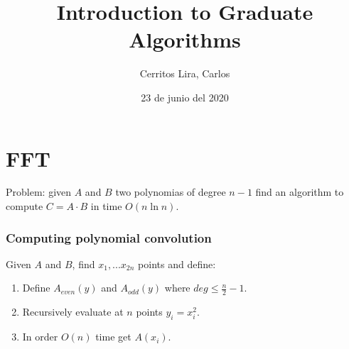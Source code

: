 \documentclass{article}
\title{Introduction to Graduate Algorithms}
\author{Cerritos Lira, Carlos}
\date{23 de junio del 2020}
\begin{document}
\maketitle

\section*{FFT}
Problem: given $A$ and $B$ two polynomias of degree $n-1$ find an 
algorithm to compute $C = A \cdot B$ in time $O(n \ln n)$. 
\subsubsection*{Computing polynomial convolution}
Given $A$ and $B$, find $x_1,...x_{2n}$ points and define:
\begin{enumerate}
    \item Define $A_{even}(y)$ and $A_{odd}(y)$ where $deg \leq \tfrac{n}{2}-1$.
    \item Recursively evaluate at $n$ points $y_{i} = x_i^2$.
    \item In order $O(n)$ time get $A(x_i)$.
\end{enumerate}
\end{document}
